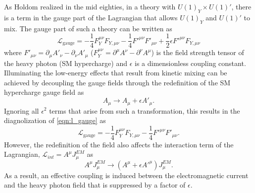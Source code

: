 As Holdom \cite{Holdom:1985ag} realized in the mid eighties, in a theory with 
$U(1)_Y \times U(1)'$, there is a term in the gauge part of the Lagrangian 
that allows $U(1)_Y$ and $U(1)'$ to mix.  The gauge part of such a theory can
be written as
\begin{equation}
    \mathcal{L}_{\text{gauge}} = - \frac{1}{4} F_Y^{\mu \nu}F_{Y, \mu \nu}
                          - \frac{1}{4} F'^{\mu \nu}F'_{\mu \nu}
                          + \frac{1}{2} \epsilon F'^{\mu \nu} F_{Y, \mu \nu}
    \label{eqn:l_gauge}
\end{equation}
where $F'_{\mu \nu} = \partial_{\mu}A'_{\nu} - \partial_{\nu}A'_{\mu}$ 
($F^{\mu \nu}_{Y} = \partial^{\mu}A^{\nu} - \partial^{\nu}A^{\mu}$) is the
field strength tensor of the heavy photon (SM hypercharge) and $\epsilon$ is a
dimensionless coupling constant.  Illuminating the low-energy effects that result
from kinetic mixing can be achieved by decoupling the gauge fields through the
redefinition of the SM hypercharge gauge field as
\begin{equation}
    A_{\mu} \rightarrow A_{\mu} + \epsilon A'_{\mu}.
\end{equation}
Ignoring all $\epsilon^2$ terms that arise from such a transformation, this
results in the diagnolization of \ref{eqn:l_gauge} as
\begin{equation}
    \mathcal{L}_{\text{gauge}} = - \frac{1}{4} F_Y^{\mu \nu}F_{Y, \mu \nu}
                          - \frac{1}{4} F'^{\mu \nu}F'_{\mu \nu}.
\end{equation}
However, the redefinition of the field also affects the interaction term of 
the Lagrangian, $\mathcal{L}_{int} = A^{\mu}J_{\mu}^{EM}$ as
\begin{equation}
    A^{\mu}J_{\mu}^{EM} \rightarrow (A^{\mu} + \epsilon A'^{\mu})J_{\mu}^{EM}.
\end{equation}
As a result, an effective coupling is induced between the electromagnetic current and 
the heavy photon field that is suppressed by a factor of $\epsilon$.

